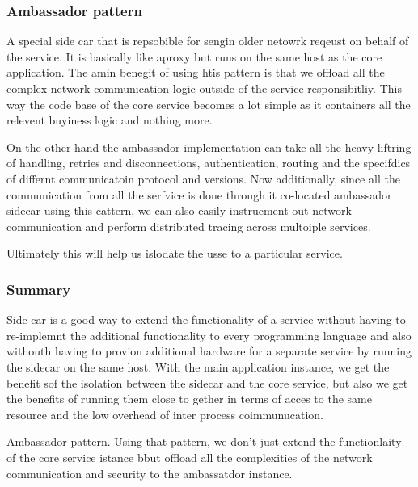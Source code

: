 \documentclass[a4paper, 11pt]{book}
\begin{document}
    \subsubsection{Ambassador pattern}
    A special side car that is repsobible for sengin older netowrk reqeust on behalf of the service.
    It is basically like aproxy but runs on the same host as the core application.
    The amin benegit of using htis pattern is that we offload all the complex network communication logic outside of the service responsibitliy.
    This way the code base of the core service becomes a lot simple as it containers all the relevent buyiness logic and nothing more.

    On the other hand the ambassador implementation can take all the heavy liftring of handling, retries and disconnections, authentication, routing and the specifdics of differnt communicatoin protocol and versions.
    Now additionally, since all the communication from all the serfvice is done through it co-located ambassador sidecar using this cattern, we can also easily instrucment out network communication and perform distributed tracing across multoiple services.

    Ultimately this will help us islodate the usse to a particular service.

    \subsubsection{Summary}
    Side car is a good way to extend the functionality of a service without having to re-implemnt the additional functionality to every programming language and also withouth having to provion additional hardware for a separate service by running the sidecar on the same host.
    With the main application instance, we get the benefit sof the isolation between the sidecar and the core service, but also we get the benefits of running them close to gether in terms of acces to the same resource and the low overhead of inter process coimmunucation.

    Ambassador pattern.
    Using that pattern, we don't just extend the functionlaity of the core service istance bbut offload all the complexities of the network communication and security to the ambassatdor instance.
\end{document}
